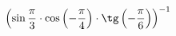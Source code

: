 \begin{ex}[type=calculate_expression]
	\begin{condition}
		\( \left( \sin\dfrac{\pi}{3}\cdot\cos\left( -\dfrac{\pi}{4}\right) \cdot \tg\left( -\dfrac{\pi}{6} \right) \right)^{-1} \)
	\end{condition}
\end{ex}